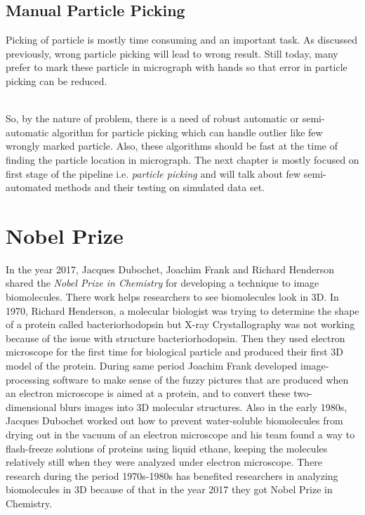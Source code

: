 \documentclass[twoside]{iitbreport}
\begin{document}
\subsection{Manual Particle Picking}
Picking of particle is mostly time consuming and an important task. As discussed previously, wrong particle picking will lead to wrong result. Still today, many prefer to mark these particle in micrograph with hands so that error in particle picking can be reduced.   

\noindent\\
So, by the nature of problem, there is a need of robust automatic or semi-automatic algorithm for particle picking which can handle outlier like few wrongly marked particle. Also, these algorithms should be fast at the time of finding the particle location in micrograph. The next chapter is mostly focused on first stage of the pipeline i.e. \textit{particle picking} and will talk about few semi-automated methods and their testing on simulated data set.  

\section{Nobel Prize}
In the year 2017, Jacques Dubochet, Joachim Frank and Richard Henderson shared the \textit{Nobel Prize in Chemistry} for developing a technique to image biomolecules. There work helps researchers to see biomolecules look in 3D. In 1970, Richard Henderson, a molecular biologist was trying to determine the shape of a protein called bacteriorhodopsin but X-ray Crystallography was not working because of the issue with structure bacteriorhodopsin. Then they used electron microscope for the first time for biological particle and produced their first 3D model of the protein. During same period Joachim Frank developed image-processing software to make sense of the fuzzy pictures that are produced when an electron microscope is aimed at a protein, and to convert these two-dimensional blurs images into 3D molecular structures. Also in the early 1980s, Jacques Dubochet worked out how to prevent water-soluble biomolecules from drying out in the vacuum of an electron microscope and  his team found a way to flash-freeze solutions of proteins using liquid ethane, keeping the molecules relatively still when they were analyzed under electron microscope. There research during the period 1970s-1980s has benefited researchers in analyzing biomolecules in 3D because of that in the year 2017 they got Nobel Prize in Chemistry.
\end{document}
